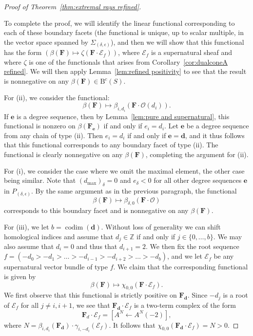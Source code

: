 \documentclass[12pt]{amsart}
\theoremstyle{definition}
\theoremstyle{remark}
\newcommand{\codim}{\operatorname{codim}}
\newcommand{\ZZ}{\mathbb{Z}}
\newcommand{\cc}{c}
\newcommand{\dd}{\mathbf{d}}
\newcommand{\ee}{\mathbf{e}}
\newcommand{\cO}{\mathcal{O}}
\newcommand{\cE}{\mathcal{E}}
\newcommand{\FF}{\mathbf{F}}
\newcommand{\BBQ}{\mathrm{B}}
\begin{document}
\begin{proof}[Proof of Theorem~\ref{thm:extremal rays refined}]
\begin{enumerate}[(i)]
\end{enumerate} 

To complete the proof, we will identify the linear functional corresponding to each of these boundary facets (the functional is unique, up to scalar multiple, in the vector space spanned by $\Sigma_{(\delta,\epsilon)}$), and then we will show that this functional has the form $(\beta(\FF)\mapsto \zeta(\FF\cdot \cE_f))$, where $\cE_f$ is a supernatural sheaf and where $\zeta$ is one of the functionals that arises from Corollary~\ref{cor:dualconeA refined}.   We will then apply Lemma~\ref{lem:refined positivity} to see that the result is nonnegative on any $\beta(\FF)\in \BBQ^{\cc}(S)$.

For (ii), we consider the functional:
\[
\beta(\FF)\mapsto \beta_{i,{d_i}}(\FF\cdot \cO(d_i)).
\]
If $\ee$ is a degree sequence, then by Lemma~\ref{lem:pure and supernatural}, this functional is nonzero on $\beta(\FF_{\ee})$ if and only if $e_i=d_i$.
Let $\ee$ be a degree sequence from any chain of type (ii).  Then $e_i=d_i$ if and only if $\ee=\dd$, and it thus follows that this functional corresponds to any boundary facet of type (ii).  The functional is clearly nonnegative on any $\beta(\FF)$, completing the argument for (ii).

For (i), we consider the case where we omit the maximal element, the other case being similar.  Note that $(d_{\max})_{\delta}=0$ and $e_{\delta}<0$ for all other degree sequences $\ee$ in $P_{(\delta,\epsilon)}$.  By the same argument as in the previous paragraph, the functional 
\[
\beta(\FF)\mapsto \beta_{\delta,0}(\FF\cdot \cO)
\]
corresponds to this boundary facet and is nonnegative on any $\beta(\FF)$.

For (iii), we let $b=\codim(\dd)$.  Without loss of generality we can shift homological indices and assume that $d_j\in \ZZ$ if and only if $j\in \{0, \dots, b\}$.   We may also assume that $d_i=0$ and thus that $d_{i+1}=2$.  We then fix the root sequence $f=(-d_0>-d_1>\dots >-d_{i-1}>-d_{i+2}>\dots >-d_{b})$, and we let $\cE_f$ be any supernatural vector bundle of type $f$.  We claim that the corresponding functional is given by
\begin{equation}\label{eqn:caseiii}
\beta(\FF) \mapsto \chi_{0,0}(\FF\cdot \cE_f).
\end{equation}
We first observe that this functional is strictly positive on $\FF_{\dd}$.  Since $-d_j$ is a root of $\cE_f$ for all $j\ne i,i+1$, we see that $\FF_{\dd}\cdot \cE_f$ is a two-term complex of the form
\[
\FF_d\cdot \cE_f=\left[ A^N \gets A^N(-2)\right],
\]
where $N=\beta_{i,d_i}(\FF_{\dd})\cdot \gamma_{i,-d_i}(\cE_f)$.  It follows that $\chi_{0,0}(\FF_{\dd}\cdot \cE_f)=N>0$.  


\end{proof}
\end{document}
